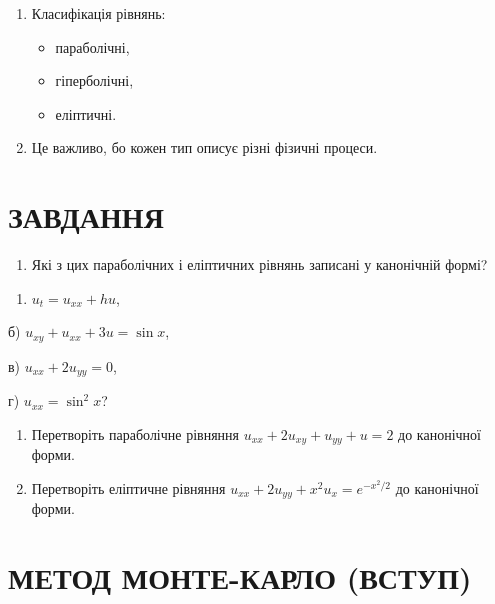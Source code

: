 \begin{enumerate}
\def\labelenumi{\arabic{enumi}.}
\tightlist
\item
  Класифікація рівнянь:

  \begin{itemize}
  \tightlist
  \item
    параболічні,
  \item
    гіперболічні,
  \item
    еліптичні.
  \end{itemize}
\item
  Це важливо, бо кожен тип описує різні фізичні процеси.
\end{enumerate}

\section{ЗАВДАННЯ}\label{ux437ux430ux432ux434ux430ux43dux43dux44f-11}

\begin{enumerate}
\def\labelenumi{\arabic{enumi}.}
\tightlist
\item
  Які з цих параболічних і еліптичних рівнянь записані у канонічній формі?
\end{enumerate}

\begin{enumerate}
\def\labelenumi{\alph{enumi})}
\tightlist
\item
  \(u_t = u_{xx} + hu\),
\end{enumerate}

б) \(u_{xy} + u_{xx} + 3u = \sin x\),

в) \(u_{xx} + 2u_{yy} = 0\),

г) \(u_{xx} = \sin^2 x\)?

\begin{enumerate}
\def\labelenumi{\arabic{enumi}.}
\setcounter{enumi}{1}
\item
  Перетворіть параболічне рівняння \(u_{xx} + 2u_{xy} + u_{yy} + u = 2\) до канонічної форми.
\item
  Перетворіть еліптичне рівняння \(u_{xx} + 2u_{yy} + x^2 u_x = e^{-x^2/2}\) до канонічної форми.
\end{enumerate}

\section{МЕТОД МОНТЕ-КАРЛО (ВСТУП)}\label{ux43cux435ux442ux43eux434-ux43cux43eux43dux442ux435-ux43aux430ux440ux43bux43e-ux432ux441ux442ux443ux43f}

